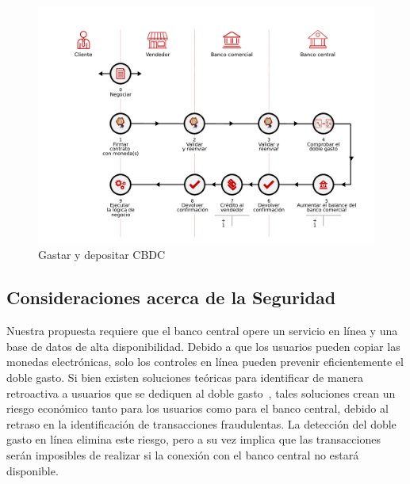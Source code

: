 \documentclass[a4paper,10pt]{article} %
\begin{document}
\begin{figure}[h!]
  \includegraphics[width=\textwidth]{deposito.pdf}
  \caption{Gastar y depositar CBDC}
  \label{fig:fig2}
\end{figure}

\hypertarget{consideraciones-acerca-de-la-seguridad}{%
\subsection{Consideraciones acerca de la Seguridad}
\label{consideraciones-acerca-de-la-seguridad}}

Nuestra propuesta requiere que el banco central opere un servicio en
línea y una base de datos de alta disponibilidad. Debido a que los
usuarios pueden copiar las monedas electrónicas, solo los controles en
línea pueden prevenir eficientemente el doble gasto. Si bien existen
soluciones teóricas para identificar de manera retroactiva a usuarios
que se dediquen al doble gasto~\cite[véase][]{Chaum1990}, tales
soluciones crean un riesgo económico tanto para los usuarios como para
el banco central, debido al retraso en la identificación de
transacciones fraudulentas. La detección del doble gasto en línea
elimina este riesgo, pero a su vez implica que las transacciones serán
imposibles de realizar si la conexión con el banco central no estará
disponible.
\end{document}
